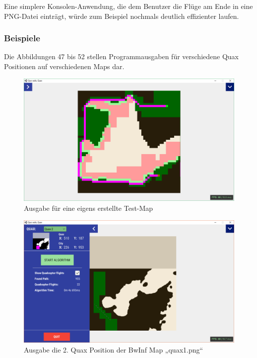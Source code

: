 \documentclass[a4paper,12pt]{article}
\begin{document}
Eine simplere Konsolen-Anwendung, die dem Benutzer die Flüge am Ende in eine PNG-Datei einträgt, würde zum Beispiel nochmals deutlich effizienter laufen.


\subsubsection{Beispiele}
Die Abbildungen 47 bis 52 stellen Programmausgaben für verschiedene Quax Positionen auf verschiedenen Maps dar.
\begin{figure}[H]
\centering
    \includegraphics[width=1\linewidth]{Bilder/Aufgabe3/Programm/eigen_08.png}
    \caption{Ausgabe für eine eigens erstellte Test-Map}
\end{figure}
\begin{figure}[H]
\centering
    \includegraphics[width=1\linewidth]{Bilder/Aufgabe3/Programm/quax1_02.png}
    \caption{Ausgabe die 2. Quax Position der BwInf Map „quax1.png“}
\end{figure}
\end{document}
